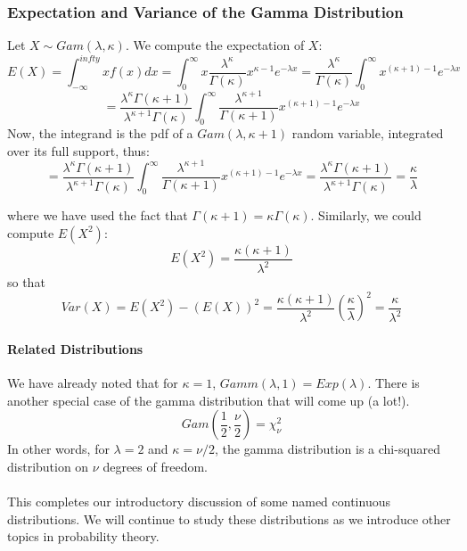 \documentclass[12pt]{article} %
\begin{document}
\subsubsection{Expectation and Variance of the Gamma Distribution}
Let $X \sim Gam(\lambda,\kappa)$.  We compute the expectation of $X$:
$$E(X) = \int_{-\infty}^{infty}x f(x) dx = \int_0^\infty x \frac{\lambda^\kappa}{\Gamma(\kappa)}x^{\kappa-1} e^{-\lambda x} = \frac{\lambda^\kappa}{\Gamma(\kappa)}\int_0^\infty x^{(\kappa+1)-1} e^{-\lambda x}$$
$$ =  \frac{\lambda^\kappa\Gamma(\kappa+1)}{\lambda^{\kappa+1}\Gamma(\kappa)}\int_0^\infty \frac{\lambda^{\kappa+1}}{\Gamma(\kappa+1)}x^{(\kappa+1)-1} e^{-\lambda x}$$
Now, the integrand is the pdf of a $Gam(\lambda,\kappa+1)$ random variable, integrated over its full support, thus:
$$ =  \frac{\lambda^\kappa\Gamma(\kappa+1)}{\lambda^{\kappa+1}\Gamma(\kappa)}\int_0^\infty \frac{\lambda^{\kappa+1}}{\Gamma(\kappa+1)}x^{(\kappa+1)-1} e^{-\lambda x} = \frac{\lambda^\kappa\Gamma(\kappa+1)}{\lambda^{\kappa+1}\Gamma(\kappa)} = \frac{\kappa}{\lambda}$$

where we have used the fact that $\Gamma(\kappa+1) = \kappa\Gamma(\kappa)$. Similarly, we could compute $E(X^2)$:
$$E(X^2) = \frac{\kappa(\kappa+1)}{\lambda^2}$$
so that 
$$Var(X) = E(X^2)-\left(E(X)\right)^2 =   \frac{\kappa(\kappa+1)}{\lambda^2}\left(\frac{\kappa}{\lambda}\right)^2 = \frac{\kappa}{\lambda^2}$$
\paragraph{Related Distributions}
We have already noted that for $\kappa=1$, $Gamm(\lambda,1)=Exp(\lambda)$. There is another special case of the gamma distribution that will come up (a lot!).
$$Gam(\frac12,\frac{\nu}2) =\chi^2_\nu$$
In other words, for $\lambda =2$ and $\kappa=\nu/2$, the gamma distribution is a chi-squared distribution on $\nu$ degrees of freedom.\\\\
This completes our introductory discussion of some named continuous distributions. We will continue to study these distributions as we introduce other topics in probability theory.
\end{document}
